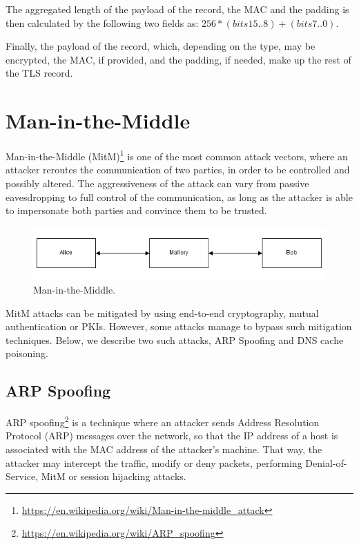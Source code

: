 The aggregated length of the payload of the record, the MAC and the padding is
then calculated by the following two fields as: \begin{math}256*(bits 15..8) +
(bits 7..0)\end{math}.

Finally, the payload of the record, which, depending on the type, may be
encrypted, the MAC, if provided, and the padding, if needed, make up the rest of
the TLS record.

\section{Man-in-the-Middle}\label{sec:mitm}

Man-in-the-Middle
(MitM)\footnote{\url{https://en.wikipedia.org/wiki/Man-in-the-middle_attack}} is
one of the most common attack vectors, where an attacker reroutes the
communication of two parties, in order to be controlled and possibly altered.
The aggressiveness of the attack can vary from passive eavesdropping to full
control of the communication, as long as the attacker is able to impersonate
both parties and convince them to be trusted.

\begin{figure}[H] \caption{Man-in-the-Middle.} \centering
\includegraphics[width=1\textwidth]{diagrams/mitm.png}\end{figure}

MitM attacks can be mitigated by using end-to-end cryptography, mutual
authentication or PKIs. However, some attacks manage to bypass such mitigation
techniques. Below, we describe two such attacks, ARP Spoofing and DNS cache
poisoning.

\subsection{ARP Spoofing}

ARP spoofing\footnote{\url{https://en.wikipedia.org/wiki/ARP_spoofing}} is a
technique where an attacker sends Address Resolution Protocol (ARP) messages
over the network, so that the IP address of a host is associated with the MAC
address of the attacker's machine. That way, the attacker may intercept the
traffic, modify or deny packets, performing Denial-of-Service, MitM or session
hijacking attacks.

